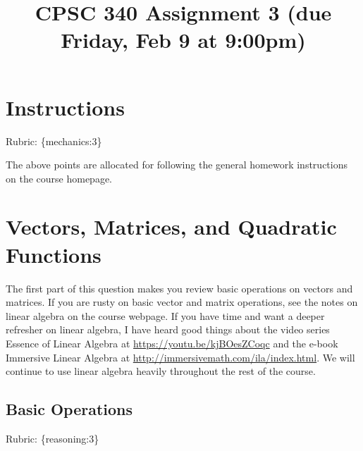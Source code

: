 \documentclass{article}
\def\rubric#1{\gre{Rubric: \{#1\}}}{}
\def\gre#1{{\color{gre}#1}}
\begin{document}
\title{CPSC 340 Assignment 3 (due Friday, Feb 9 at 9:00pm)}
\date{}
\maketitle

\vspace{-7em}

\section*{Instructions}
\rubric{mechanics:3}

The above points are allocated for following the general homework instructions on the course homepage.

\tableofcontents

\section{Vectors, Matrices, and Quadratic Functions}

The first part of this question makes you review basic operations on vectors and matrices.
If you are rusty on basic vector and matrix operations, see the notes on linear algebra on the course webpage.
If you have time and want a deeper refresher on linear algebra, I have heard good things about
the video series Essence of Linear Algebra at \url{https://youtu.be/kjBOesZCoqc} and the e-book
Immersive Linear Algebra at \url{http://immersivemath.com/ila/index.html}. We will continue to use linear algebra
heavily throughout the rest of the course.


\subsection{Basic Operations}
\rubric{reasoning:3}
\end{document}
